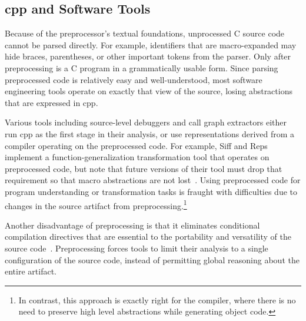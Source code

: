 \documentclass{article}
\newcommand{\Cpp}{\mbox{\textsf{cpp}}}
\newcommand{\C}{\mbox{C}}
\newcommand{\ppd}[1]{\texttt{\##1}}
\begin{document}

\subsection{\Cpp{} and Software Tools}

Because of the preprocessor's textual foundations, unprocessed \C{} source code
cannot be parsed directly.  For example, identifiers that are macro-expanded may
hide braces, parentheses, or other 
important tokens from the parser.  Only after preprocessing is a \C{} program
in a grammatically usable form. Since parsing
preprocessed code is relatively easy and well-understood,
most software engineering tools operate on
exactly that view of the source, losing abstractions that are
expressed in \Cpp{}.  

Various tools including source-level debuggers and call graph extractors
either run \Cpp{} as the first stage in their analysis, or use
representations derived from a compiler operating on the preprocessed
code.  For example,
Siff and Reps implement a function-generalization transformation
tool that operates on preprocessed code, but note that future versions
of their tool must drop that requirement so that macro abstractions are
not lost~\cite{Siff96}. Using preprocessed code for program
understanding or transformation tasks is fraught with difficulties due
to changes in the source artifact from preprocessing.\footnote{In
  contrast, this approach is exactly right for the compiler, where there is
  no need to preserve high level abstractions while generating object
  code.}


Another disadvantage of preprocessing is that it eliminates
conditional compilation directives that are essential to the portability
and versatility of the source code~\cite{Krone94}.  Preprocessing
forces tools to limit their analysis to a single configuration of the
source code, instead of permitting global reasoning about the entire
artifact.  
\end{document}
